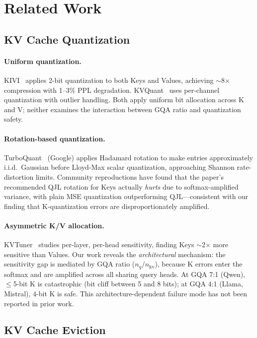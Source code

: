 \section{Related Work}
\label{sec:related}

\subsection{KV Cache Quantization}

\paragraph{Uniform quantization.}
KIVI~\citep{kivi2024} applies 2-bit quantization to both Keys and Values, achieving $\sim$8$\times$ compression with 1--3\% PPL degradation.
KVQuant~\citep{kvquant2024} uses per-channel quantization with outlier handling.
Both apply uniform bit allocation across K and V; neither examines the interaction between GQA ratio and quantization safety.

\paragraph{Rotation-based quantization.}
TurboQuant~\citep{turboquant2026} (Google) applies Hadamard rotation to make entries approximately i.i.d.\ Gaussian before Lloyd-Max scalar quantization, approaching Shannon rate-distortion limits.
Community reproductions have found that the paper's recommended QJL rotation for Keys actually \emph{hurts} due to softmax-amplified variance, with plain MSE quantization outperforming QJL---consistent with our finding that K-quantization errors are disproportionately amplified.

\paragraph{Asymmetric K/V allocation.}
KVTuner~\citep{kvtuner2025} studies per-layer, per-head sensitivity, finding Keys $\sim$2$\times$ more sensitive than Values.
Our work reveals the \emph{architectural} mechanism: the sensitivity gap is mediated by GQA ratio ($n_q / n_\text{kv}$), because K errors enter the softmax and are amplified across all sharing query heads.
At GQA 7:1 (Qwen), $\leq$5-bit K is catastrophic (bit cliff between 5 and 8 bits); at GQA 4:1 (Llama, Mistral), 4-bit K is safe.
This architecture-dependent failure mode has not been reported in prior work.

\subsection{KV Cache Eviction}


